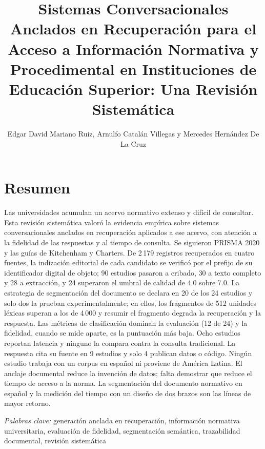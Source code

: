 \documentclass[man,12pt,floatsintext,donotrepeattitle]{apa7}
\title{Sistemas Conversacionales Anclados en Recuperación para el Acceso a Información Normativa y Procedimental en Instituciones de Educación Superior: Una Revisión Sistemática}
\author{Edgar David Mariano Ruiz, Arnulfo Catalán Villegas y Mercedes Hernández De La Cruz}
\affiliation{Facultad de Ingeniería, Universidad Autónoma de Guerrero\\Maestría en Ingeniería para la Innovación y el Desarrollo Tecnológico\\Octubre de 2026}
\begin{document}
\maketitle
\section*{Resumen}
\noindent Las universidades acumulan un acervo normativo extenso y difícil de consultar. Esta revisión sistemática valoró la evidencia empírica sobre sistemas conversacionales anclados en recuperación aplicados a ese acervo, con atención a la fidelidad de las respuestas y al tiempo de consulta. Se siguieron PRISMA 2020 y las guías de Kitchenham y Charters. De 2\,179 registros recuperados en cuatro fuentes, la indización editorial de cada candidato se verificó por el prefijo de su identificador digital de objeto; 90 estudios pasaron a cribado, 30 a texto completo y 28 a extracción, y 24 superaron el umbral de calidad de 4.0 sobre 7.0. La estrategia de segmentación del documento se declara en 20 de los 24 estudios y solo dos la prueban experimentalmente; en ellos, los fragmentos de 512 unidades léxicas superan a los de 4\,000 y resumir el fragmento degrada la recuperación y la respuesta. Las métricas de clasificación dominan la evaluación (12 de 24) y la fidelidad, cuando se mide aparte, es la puntuación más baja. Ocho estudios reportan latencia y ninguno la compara contra la consulta tradicional. La respuesta cita su fuente en 9 estudios y solo 4 publican datos o código. Ningún estudio trabaja con un corpus en español ni proviene de América Latina. El anclaje documental reduce la invención de datos; falta demostrar que reduce el tiempo de acceso a la norma. La segmentación del documento normativo en español y la medición del tiempo con un diseño de dos brazos son las líneas de mayor retorno.
\par\indent\textit{Palabras clave:} generación anclada en recuperación, información normativa universitaria, evaluación de fidelidad, segmentación semántica, trazabilidad documental, revisión sistemática
\end{document}
